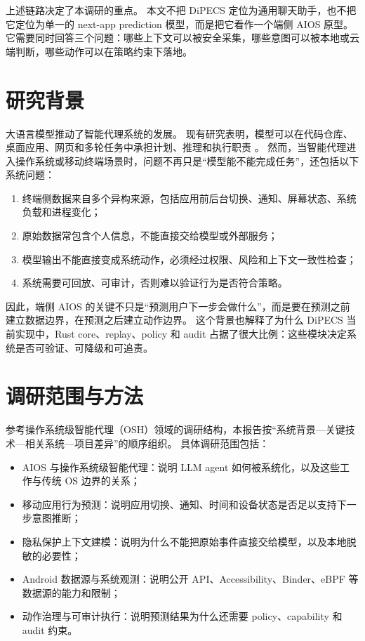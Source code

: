 \documentclass[12pt,a4paper]{article}
\begin{document}
上述链路决定了本调研的重点。
本文不把 DiPECS 定位为通用聊天助手，也不把它定位为单一的 next-app prediction 模型，而是把它看作一个端侧 AIOS 原型。
它需要同时回答三个问题：哪些上下文可以被安全采集，哪些意图可以被本地或云端判断，哪些动作可以在策略约束下落地。

\section{研究背景}\label{sec:background}

大语言模型推动了智能代理系统的发展。
现有研究表明，模型可以在代码仓库、桌面应用、网页和多轮任务中承担计划、推理和执行职责 \cite{xi2023rise}。
然而，当智能代理进入操作系统或移动终端场景时，问题不再只是``模型能不能完成任务''，还包括以下系统问题：

\begin{enumerate}[label=(\arabic*)]
  \item 终端侧数据来自多个异构来源，包括应用前后台切换、通知、屏幕状态、系统负载和进程变化；
  \item 原始数据常包含个人信息，不能直接交给模型或外部服务；
  \item 模型输出不能直接变成系统动作，必须经过权限、风险和上下文一致性检查；
  \item 系统需要可回放、可审计，否则难以验证行为是否符合策略。
\end{enumerate}

因此，端侧 AIOS 的关键不只是``预测用户下一步会做什么''，而是要在预测之前建立数据边界，在预测之后建立动作边界。
这个背景也解释了为什么 DiPECS 当前实现中，Rust core、replay、policy 和 audit 占据了很大比例：这些模块决定系统是否可验证、可降级和可追责。

\section{调研范围与方法}\label{sec:scope}

参考操作系统级智能代理（OSH）领域的调研结构，本报告按``系统背景—关键技术—相关系统—项目差异''的顺序组织。
具体调研范围包括：

\begin{itemize}
  \item AIOS 与操作系统级智能代理：说明 LLM agent 如何被系统化，以及这些工作与传统 OS 边界的关系；
  \item 移动应用行为预测：说明应用切换、通知、时间和设备状态是否足以支持下一步意图推断；
  \item 隐私保护上下文建模：说明为什么不能把原始事件直接交给模型，以及本地脱敏的必要性；
  \item Android 数据源与系统观测：说明公开 API、Accessibility、Binder、eBPF 等数据源的能力和限制；
  \item 动作治理与可审计执行：说明预测结果为什么还需要 policy、capability 和 audit 约束。
\end{itemize}
\end{document}
